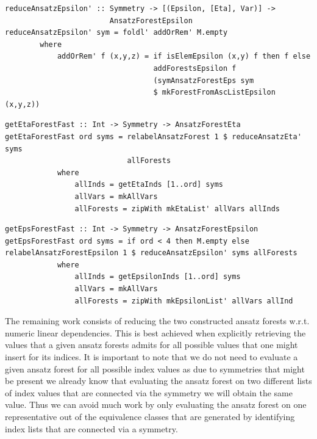 \documentclass[a4paper,12pt, DIV=14, BCOR=5mm, twoside, headsepline]{scrbook}
\begin{document}
\begin{samepage}
\begin{verbatim}
reduceAnsatzEpsilon' :: Symmetry -> [(Epsilon, [Eta], Var)] ->
                        AnsatzForestEpsilon
reduceAnsatzEpsilon' sym = foldl' addOrRem' M.empty
        where
            addOrRem' f (x,y,z) = if isElemEpsilon (x,y) f then f else
                                  addForestsEpsilon f 
                                  (symAnsatzForestEps sym 
                                  $ mkForestFromAscListEpsilon (x,y,z))  
\end{verbatim} 
\end{samepage}

\begin{samepage}
\begin{verbatim}
getEtaForestFast :: Int -> Symmetry -> AnsatzForestEta
getEtaForestFast ord syms = relabelAnsatzForest 1 $ reduceAnsatzEta' syms 
                            allForests
            where
                allInds = getEtaInds [1..ord] syms
                allVars = mkAllVars
                allForests = zipWith mkEtaList' allVars allInds
\end{verbatim} 
\end{samepage}

\begin{samepage}
\begin{verbatim}
getEpsForestFast :: Int -> Symmetry -> AnsatzForestEpsilon
getEpsForestFast ord syms = if ord < 4 then M.empty else
relabelAnsatzForestEpsilon 1 $ reduceAnsatzEpsilon' syms allForests
            where
                allInds = getEpsilonInds [1..ord] syms
                allVars = mkAllVars
                allForests = zipWith mkEpsilonList' allVars allInd
\end{verbatim} 
\end{samepage}

The remaining work consists of reducing the two constructed ansatz forests w.r.t. numeric linear dependencies. This is best achieved when explicitly retrieving the values that a given ansatz forests admits for all possible values that one might insert for its indices. It is important to note that we do not need to evaluate a given ansatz forest for all possible index values as due to symmetries that might be present we already know that evaluating the ansatz forest on two different lists of index values that are connected via the symmetry we will obtain the same value. Thus we can avoid much work by only evaluating the ansatz forest on one representative out of the equivalence classes that are generated by identifying index lists that are connected via a symmetry. 
\end{document}
